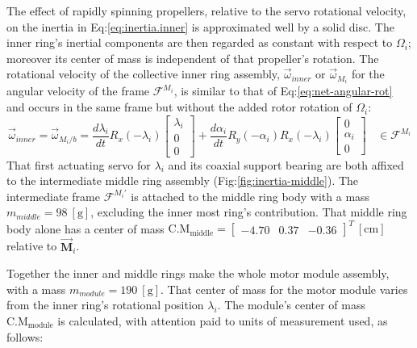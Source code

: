 The effect of rapidly spinning propellers, relative to the servo rotational velocity, on the inertia in Eq:\ref{eq:inertia.inner} is approximated well by a solid disc. The inner ring's inertial components are then regarded as constant with respect to $\Omega_i$; moreover its center of mass is independent of that propeller's rotation. The rotational velocity of the collective inner ring assembly, $\vec{\omega}_{inner}$ or $\vec{\omega}_{M_i}$ for the angular velocity of the frame $\mathcal{F}^{M_i}$, is similar to that of Eq:\ref{eq:net-angular-rot} and occurs in the same frame but without the added rotor rotation of $\Omega_i$:
\begin{equation}\label{eq:net-angular-inner}
\vec{\omega}_{inner}=\vec{\omega}_{M_i/b}=\frac{d\lambda_i}{dt}R_x(-\lambda_i)\begin{bmatrix}
\lambda_i\\
0\\
0
\end{bmatrix}
+\frac{d\alpha_i}{dt}R_y(-\alpha_i)R_x(-\lambda_i)\begin{bmatrix}
0\\
\alpha_i\\
0
\end{bmatrix}~~~~\in\mathcal{F}^{M_i}
\end{equation}
That first actuating servo for $\lambda_i$ and its coaxial support bearing are both affixed to the intermediate middle ring assembly (Fig:\ref{fig:inertia-middle}). The intermediate frame $\mathcal{F}^{M_i'}$ is attached to the middle ring body with a mass $m_{middle}=98~[\text{g}]$, excluding the inner most ring's contribution. That middle ring body alone has a center of mass $\text{C.M}_{\text{middle}}=\begin{bmatrix}
-4.70&0.37&-0.36\end{bmatrix}^T~[\text{cm}]$ relative to $\vec{\mathbf{M}}_i$.
\par
Together the inner and middle rings make the whole motor module assembly, with a mass $m_{module}=190~[\text{g}]$. That center of mass for the motor module varies from the inner ring's rotational position $\lambda_i$. The module's center of mass $\text{C.M}_{\text{module}}$ is calculated, with attention paid to units of measurement used, as follows:
